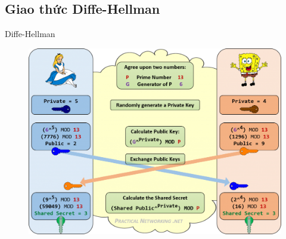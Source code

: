 \documentclass[compress]{beamer}
\begin{document}
\subsection{Giao thức Diffe-Hellman}
\begin{frame}{Diffe-Hellman}
\begin{center}
\begin{figure}
\includegraphics[width=0.9\linewidth]{../diffe-hellman.png}
\end{figure}
\end{center}
\end{frame}
\end{document}
